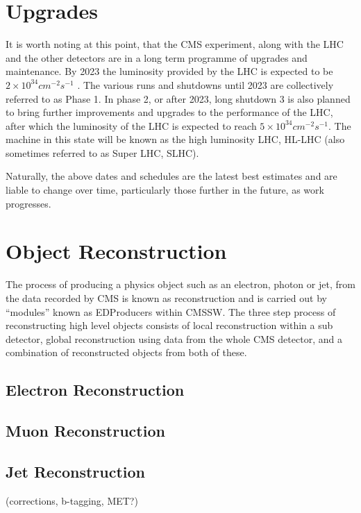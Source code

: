 \section{Upgrades}
\label{s:Upgrades}
It is worth noting at this point, that the CMS experiment, along with the LHC and the other detectors are in a
long term programme of upgrades and maintenance. By 2023 the luminosity provided by the LHC is expected to be
$2\times10^{34}cm^{-2}s^{-1}$ \cite{Technical_Proposal_Upgrade_of_CMS_Detector_through_2020}. The various runs
and shutdowns until 2023 are collectively referred to as Phase 1. In phase 2, or after 2023, long shutdown 3 is
also planned to bring further improvements and upgrades to the performance of the LHC, after which the
luminosity of the LHC is expected to reach $5\times10^{34}cm^{-2}s^{-1}$. The machine in this state will be
known as the high luminosity LHC, HL-LHC (also sometimes referred to as Super LHC, SLHC).

Naturally, the above dates and schedules are the latest best estimates and are liable to change over time,
particularly those further in the future, as work progresses.


\section{Object Reconstruction}
\label{s:Object_Reconstruction}

The process of producing a physics object such as an electron, photon or jet, from the data recorded by CMS is
known as reconstruction and is carried out by ``modules'' known as EDProducers within CMSSW. The three
step process of reconstructing high level objects consists of local reconstruction within a sub detector,
global reconstruction using data from the whole CMS detector, and a combination of reconstructed objects from
both of these.

\subsection{Electron Reconstruction}
\label{ss:Electron_Reconstruction}

\subsection{Muon Reconstruction}
\label{ss:Muon_Reconstruction}

\subsection{Jet Reconstruction}
\label{ss:Jet_Reconstruction}

(corrections, b-tagging, MET?)